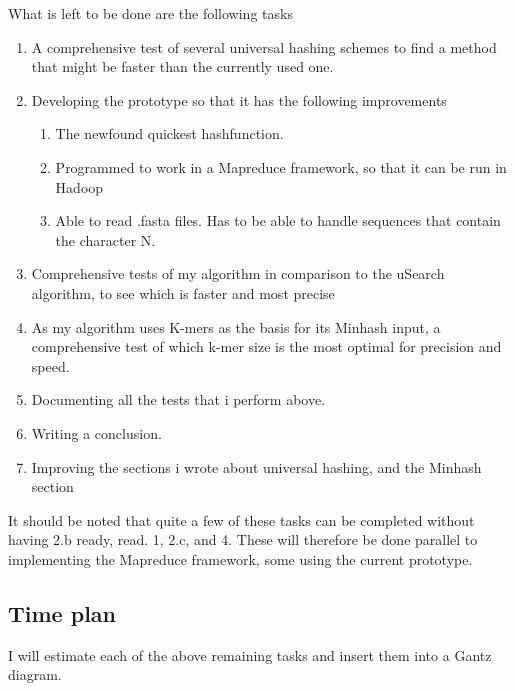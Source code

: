 \documentclass[../../main.tex]{subfiles}
\begin{document}
What is left to be done are the following tasks

\begin{enumerate}
\item A comprehensive test of several universal hashing schemes to find a method that might be faster than the currently used one.
\item Developing the prototype so that it has the following improvements
\begin{enumerate}
\item The newfound quickest hashfunction.
\item Programmed to work in a Mapreduce framework, so that it can be run in Hadoop
\item Able to read .fasta files. Has to be able to handle sequences that contain the character N.
\end{enumerate}
\item Comprehensive tests of my algorithm in comparison to the uSearch algorithm, to see which is faster and most precise
\item As my algorithm uses K-mers as the basis for its Minhash input, a comprehensive test of which k-mer size is the most optimal for precision and speed.
\item Documenting all the tests that i perform above. 
\item Writing a conclusion.
\item Improving the sections i wrote about universal hashing, and the Minhash section
\end{enumerate}

It should be noted that quite a few of these tasks can be completed without having 2.b ready, read. 1, 2.c, and 4. These will therefore be done parallel to implementing the Mapreduce framework, some using the current prototype.

\subsection{Time plan}
I will estimate each of the above remaining tasks and insert them into a Gantz diagram.\\
\end{document}
